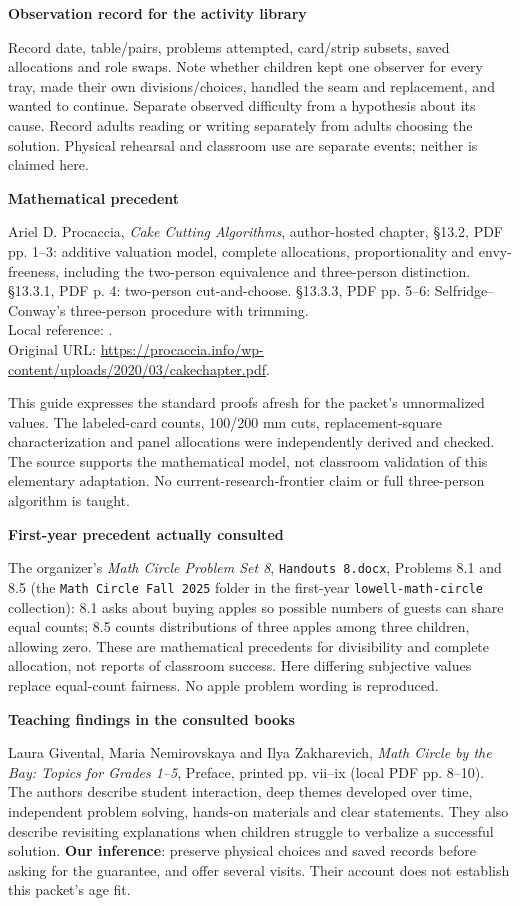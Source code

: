 \documentclass[11pt]{article}
\newcommand{\heading}[1]{\par\vspace{1.5mm}{\large\bfseries #1}\par\vspace{.8mm}}
\newcommand{\subhead}[1]{\par\vspace{1mm}\textbf{#1}\par}
\newcommand{\page}[1]{\newpage\heading{#1}}
\begin{document}
\subhead{Observation record for the activity library}
Record date, table/pairs, problems attempted, card/strip subsets, saved allocations and role swaps. Note whether children kept one observer for every tray, made their own divisions/choices, handled the seam and replacement, and wanted to continue. Separate observed difficulty from a hypothesis about its cause. Record adults reading or writing separately from adults choosing the solution. Physical rehearsal and classroom use are separate events; neither is claimed here.

\page{Sources and original adaptation}
\subhead{Mathematical precedent}
Ariel D. Procaccia, \emph{Cake Cutting Algorithms}, author-hosted chapter, \S13.2, PDF pp. 1--3: additive valuation model, complete allocations, proportionality and envy-freeness, including the two-person equivalence and three-person distinction. \S13.3.1, PDF p. 4: two-person cut-and-choose. \S13.3.3, PDF pp. 5--6: Selfridge--Conway's three-person procedure with trimming.\\
{\small Local reference: .\\
Original URL: \url{https://procaccia.info/wp-content/uploads/2020/03/cakechapter.pdf}.}

This guide expresses the standard proofs afresh for the packet's unnormalized values. The labeled-card counts, 100/200 mm cuts, replacement-square characterization and panel allocations were independently derived and checked. The source supports the mathematical model, not classroom validation of this elementary adaptation. No current-research-frontier claim or full three-person algorithm is taught.

\subhead{First-year precedent actually consulted}
The organizer's \emph{Math Circle Problem Set 8}, \texttt{Handouts 8.docx}, Problems 8.1 and 8.5 (the \texttt{Math Circle Fall 2025} folder in the first-year \texttt{lowell-math-circle} collection): 8.1 asks about buying apples so possible numbers of guests can share equal counts; 8.5 counts distributions of three apples among three children, allowing zero. These are mathematical precedents for divisibility and complete allocation, not reports of classroom success. Here differing subjective values replace equal-count fairness. No apple problem wording is reproduced.

\subhead{Teaching findings in the consulted books}
Laura Givental, Maria Nemirovskaya and Ilya Zakharevich, \emph{Math Circle by the Bay: Topics for Grades 1--5}, Preface, printed pp. vii--ix (local PDF pp. 8--10). The authors describe student interaction, deep themes developed over time, independent problem solving, hands-on materials and clear statements. They also describe revisiting explanations when children struggle to verbalize a successful solution. \textbf{Our inference}: preserve physical choices and saved records before asking for the guarantee, and offer several visits. Their account does not establish this packet's age fit.
\end{document}
